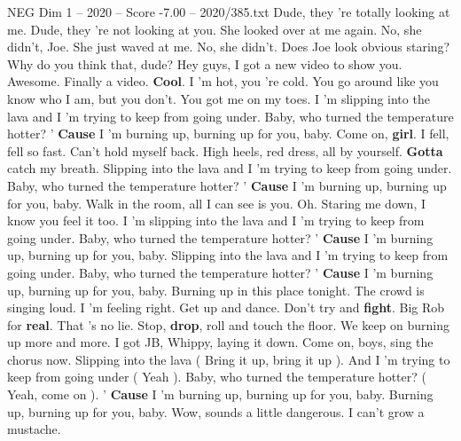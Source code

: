 \begin{textsample}{NEG Dim 1 – 2020 – Score -7.00 – 2020/385.txt}  \label{ex:f1_neg_037}
Dude, they 're totally looking at me.
Dude, they 're not looking at you.
She looked over at me again.
No, she didn't, Joe.
She just waved at me.
No, she didn't.
Does Joe look obvious staring?
Why do you think that, dude?
Hey guys, I got a new video to show you.
Awesome.
Finally a video. \textbf{Cool}.
I 'm hot, you 're cold.
You go around like you know who I am, but you don't.
You got me on my toes.
I 'm slipping into the lava and I 'm trying to keep from going under.
Baby, who turned the temperature hotter? ' \textbf{Cause} I 'm burning up, burning up for you, baby.
Come on, \textbf{girl}.
I fell, fell so fast.
Can't hold myself back.
High heels, red dress, all by yourself. \textbf{Gotta} catch my breath.
Slipping into the lava and I 'm trying to keep from going under.
Baby, who turned the temperature hotter? ' \textbf{Cause} I 'm burning up, burning up for you, baby.
Walk in the room, all I can see is you.
Oh.
Staring me down, I know you feel it too.
I 'm slipping into the lava and I 'm trying to keep from going under.
Baby, who turned the temperature hotter? ' \textbf{Cause} I 'm burning up, burning up for you, baby.
Slipping into the lava and I 'm trying to keep from going under.
Baby, who turned the temperature hotter? ' \textbf{Cause} I 'm burning up, burning up for you, baby.
Burning up in this place tonight.
The crowd is singing loud.
I 'm feeling right.
Get up and dance.
Don't try and \textbf{fight}.
Big Rob for \textbf{real}.
That 's no lie.
Stop, \textbf{drop}, roll and touch the floor.
We keep on burning up more and more.
I got JB, Whippy, laying it down.
Come on, boys, sing the chorus now.
Slipping into the lava ( Bring it up, bring it up ).
And I 'm trying to keep from going under ( Yeah ).
Baby, who turned the temperature hotter? ( Yeah, come on ). ' \textbf{Cause} I 'm burning up, burning up for you, baby.
Burning up, burning up for you, baby.
Wow, sounds a little dangerous.
I can't grow a mustache.

\end{textsample}
